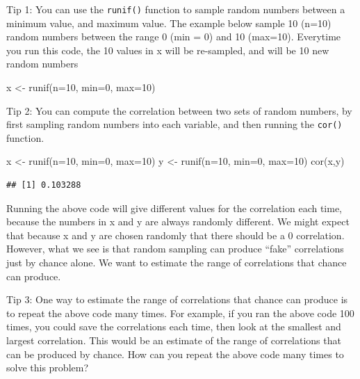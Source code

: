 \documentclass[
]{book}
\newenvironment{Shaded}{\begin{snugshade}}{\end{snugshade}}
\newcommand{\AttributeTok}[1]{\textcolor[rgb]{0.77,0.63,0.00}{#1}}
\newcommand{\DecValTok}[1]{\textcolor[rgb]{0.00,0.00,0.81}{#1}}
\newcommand{\FunctionTok}[1]{\textcolor[rgb]{0.00,0.00,0.00}{#1}}
\newcommand{\NormalTok}[1]{#1}
\newcommand{\OtherTok}[1]{\textcolor[rgb]{0.56,0.35,0.01}{#1}}
\begin{document}
Tip 1: You can use the \texttt{runif()} function to sample random numbers between a minimum value, and maximum value. The example below sample 10 (n=10) random numbers between the range 0 (min = 0) and 10 (max=10). Everytime you run this code, the 10 values in x will be re-sampled, and will be 10 new random numbers

\begin{Shaded}
\begin{Highlighting}[]
\NormalTok{x }\OtherTok{\textless{}{-}} \FunctionTok{runif}\NormalTok{(}\AttributeTok{n=}\DecValTok{10}\NormalTok{, }\AttributeTok{min=}\DecValTok{0}\NormalTok{, }\AttributeTok{max=}\DecValTok{10}\NormalTok{)}
\end{Highlighting}
\end{Shaded}

Tip 2: You can compute the correlation between two sets of random numbers, by first sampling random numbers into each variable, and then running the \texttt{cor()} function.

\begin{Shaded}
\begin{Highlighting}[]
\NormalTok{x }\OtherTok{\textless{}{-}} \FunctionTok{runif}\NormalTok{(}\AttributeTok{n=}\DecValTok{10}\NormalTok{, }\AttributeTok{min=}\DecValTok{0}\NormalTok{, }\AttributeTok{max=}\DecValTok{10}\NormalTok{)}
\NormalTok{y }\OtherTok{\textless{}{-}} \FunctionTok{runif}\NormalTok{(}\AttributeTok{n=}\DecValTok{10}\NormalTok{, }\AttributeTok{min=}\DecValTok{0}\NormalTok{, }\AttributeTok{max=}\DecValTok{10}\NormalTok{)}
\FunctionTok{cor}\NormalTok{(x,y)}
\end{Highlighting}
\end{Shaded}

\begin{verbatim}
## [1] 0.103288
\end{verbatim}

Running the above code will give different values for the correlation each time, because the numbers in x and y are always randomly different. We might expect that because x and y are chosen randomly that there should be a 0 correlation. However, what we see is that random sampling can produce ``fake'' correlations just by chance alone. We want to estimate the range of correlations that chance can produce.

Tip 3: One way to estimate the range of correlations that chance can produce is to repeat the above code many times. For example, if you ran the above code 100 times, you could save the correlations each time, then look at the smallest and largest correlation. This would be an estimate of the range of correlations that can be produced by chance. How can you repeat the above code many times to solve this problem?
\end{document}
